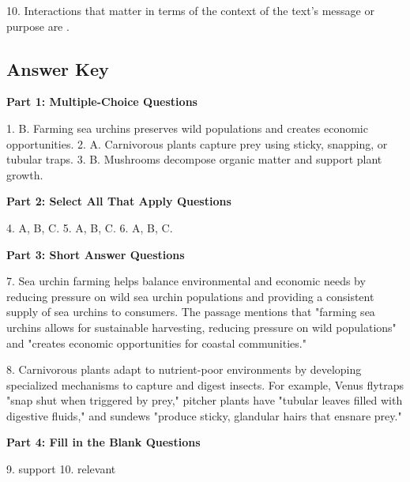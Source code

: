 \documentclass[12pt]{article}
\begin{document}
10. Interactions that matter in terms of the context of the text's message or \\purpose are \underline{\hspace{4cm}}.
\vspace{2cm}
\newpage
\subsection*{Answer Key}

\textbf{Part 1: Multiple-Choice Questions}

1. B. Farming sea urchins preserves wild populations and creates economic opportunities.  
2. A. Carnivorous plants capture prey using sticky, snapping, or tubular traps.  
3. B. Mushrooms decompose organic matter and support plant growth.  

\textbf{Part 2: Select All That Apply Questions}

4. A, B, C.  
5. A, B, C.  
6. A, B, C.  

\textbf{Part 3: Short Answer Questions}

7. Sea urchin farming helps balance environmental and economic needs by reducing pressure on wild sea urchin populations and providing a consistent supply of sea urchins to consumers. The passage mentions that "farming sea urchins allows for sustainable harvesting, reducing pressure on wild populations" and "creates economic opportunities for coastal communities."

8. Carnivorous plants adapt to nutrient-poor environments by developing specialized mechanisms to capture and digest insects. For example, Venus flytraps "snap shut when triggered by prey," pitcher plants have "tubular leaves filled with digestive fluids," and sundews "produce sticky, glandular hairs that ensnare prey."

\textbf{Part 4: Fill in the Blank Questions}

9. support  
10. relevant  
\end{document}
